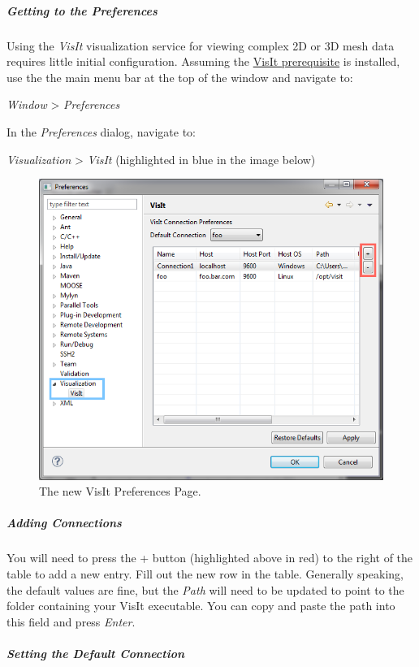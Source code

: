\subparagraph{Getting to the
Preferences}\label{getting-to-the-preferences}

Using the \emph{VisIt} visualization service for viewing complex 2D or
3D mesh data requires little initial configuration. Assuming the
\hyperref[Prerequisites]{VisIt prerequisite} is installed, use the the
main menu bar at the top of the window and navigate to:

\emph{Window} \textgreater{} \emph{Preferences}

In the \emph{Preferences} dialog, navigate to:

\emph{Visualization} \textgreater{} \emph{VisIt} (highlighted in blue in
the image below)

\begin{figure}[htbp]
\centering
\includegraphics[width=\textwidth]{figures/ICE_Viz_VisIt_Preferences.png}
\caption{The new VisIt Preferences Page.}
\end{figure}

\subparagraph{Adding Connections}\label{adding-connections}

You will need to press the + button (highlighted above in red) to the
right of the table to add a new entry. Fill out the new row in the
table. Generally speaking, the default values are fine, but the
\emph{Path} will need to be updated to point to the folder containing
your VisIt executable. You can copy and paste the path into this field
and press \emph{Enter}.

\subparagraph{Setting the Default
Connection}\label{setting-the-default-connection}

